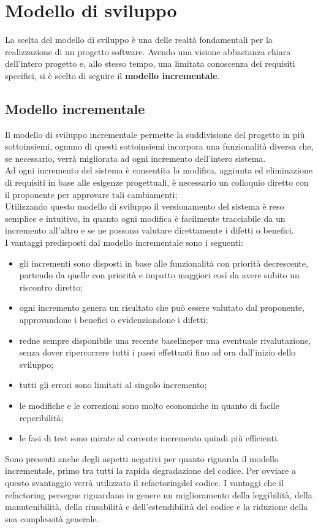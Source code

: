\section{Modello di sviluppo}
La scelta del modello di sviluppo è una delle realtà fondamentali per la realizzazione di un progetto software.
Avendo una visione abbastanza chiara dell'intero progetto e, allo stesso tempo, una limitata conoscenza dei requisiti specifici, si è scelto di seguire il \textbf{modello incrementale}.

\subsection{Modello incrementale}
Il modello di sviluppo incrementale permette la suddivisione del progetto in più sottoinsiemi,
ognuno di questi sottoinsiemi incorpora una funzionalità diversa che, se necessario, verrà migliorata ad ogni incremento dell'intero 
sistema.  \\
Ad ogni incremento del sistema è consentita la modifica, aggiunta ed eliminazione di requisiti in base alle esigenze progettuali, 
è necessario un colloquio diretto con il proponente per approvare tali cambiamenti; \\
Utilizzando questo modello di sviluppo il versionamento del sistema è reso semplice e intuitivo, in quanto ogni modifica è facilmente tracciabile da un incremento all'altro e se ne possono valutare direttamente i difetti o benefici.\\
I vantaggi predisposti dal modello incrementale sono i seguenti:
\begin{itemize}
	\item gli incrementi sono disposti in base alle funzionalità con priorità decrescente, partendo da quelle con priorità e impatto maggiori
	così da avere subito un riscontro diretto;
	\item ogni incremento genera un risultato che può essere valutato dal proponente, approvandone i benefici o evidenziandone i difetti;
	\item redne sempre disponibile una recente baseline\glosp per una eventuale rivalutazione, senza dover ripercorrere tutti i passi effettuati fino ad ora dall'inizio dello sviluppo;
	\item tutti gli errori sono limitati al singolo incremento;
	\item le modifiche e le correzioni sono molto economiche in quanto di facile reperibilità;
	\item le fasi di test sono mirate al corrente incremento quindi più efficienti.
\end{itemize}
Sono presenti anche degli aspetti negativi per quanto riguarda il modello incrementale, primo tra tutti la rapida degradazione del codice. Per ovviare a questo svantaggio verrà utilizzato il refactoring\glosp del codice. I vantaggi che il refactoring persegue riguardano in genere un miglioramento della leggibilità, della manutenibilità, della riusabilità e dell'estendibilità del codice e la riduzione della sua complessità generale.


